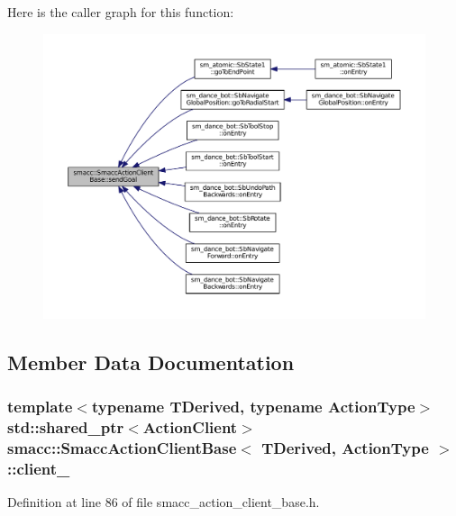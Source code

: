 Here is the caller graph for this function\+:
\nopagebreak
\begin{figure}[H]
\begin{center}
\leavevmode
\includegraphics[width=350pt]{classsmacc_1_1SmaccActionClientBase_a2ec9e5fb96ecc517a815cda209eb1b51_icgraph}
\end{center}
\end{figure}




\subsection{Member Data Documentation}
\subsubsection[{\texorpdfstring{client\+\_\+}{client_}}]{\setlength{\rightskip}{0pt plus 5cm}template$<$typename T\+Derived, typename Action\+Type$>$ std\+::shared\+\_\+ptr$<${\bf Action\+Client}$>$ {\bf smacc\+::\+Smacc\+Action\+Client\+Base}$<$ T\+Derived, Action\+Type $>$\+::client\+\_\+\hspace{0.3cm}{\ttfamily [protected]}}\hypertarget{classsmacc_1_1SmaccActionClientBase_a5ec5c74015ea4e8b61d017f666a4ce17}{}\label{classsmacc_1_1SmaccActionClientBase_a5ec5c74015ea4e8b61d017f666a4ce17}


Definition at line 86 of file smacc\+\_\+action\+\_\+client\+\_\+base.\+h.



